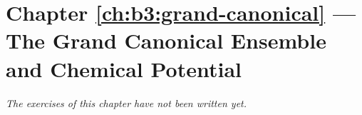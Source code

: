 \section*{Chapter \ref{ch:b3:grand-canonical} --- The Grand Canonical Ensemble and Chemical Potential}


\emph{The exercises of this chapter have not been written yet.}

